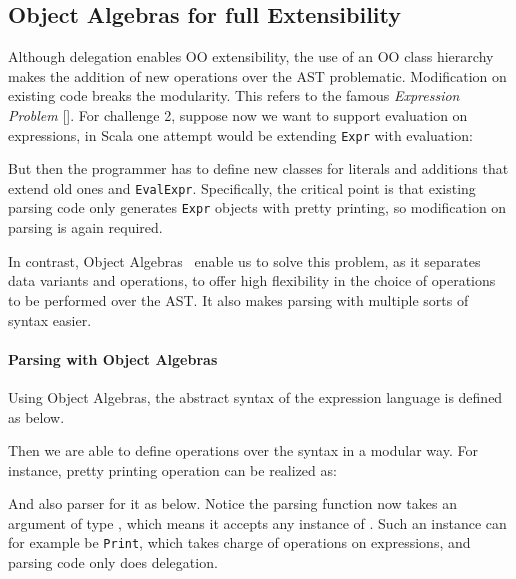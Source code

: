 \subsection{Object Algebras for full Extensibility}\label{subsec:overview-oa}

Although delegation enables OO extensibility, the use of an OO class
hierarchy makes the addition of new operations over the AST
problematic. Modification on existing code breaks the modularity. This
refers to the famous \textit{Expression Problem} []. For challenge 2, suppose now we want to
support evaluation on expressions, in Scala one attempt would be extending \lstinline{Expr} with
evaluation:

But then the programmer has to define new classes for literals and additions that extend old ones and \lstinline{EvalExpr}. Specifically,
the critical point is that existing parsing code only generates \lstinline{Expr} objects with pretty printing, so modification on parsing is again required.


In contrast, Object Algebras~\cite{Oliveira2012} enable us to solve this problem, as it separates data variants and
operations, to
offer high flexibility in the choice of operations to be performed
over the AST. It also makes parsing with multiple sorts of syntax easier.

\paragraph{Parsing with Object Algebras} Using Object Algebras, the abstract syntax of the expression language is defined as below.


Then we are able to define operations over the syntax in a modular way. For instance, pretty printing operation can be realized as:


And also parser for it as below. Notice the parsing function  now takes an argument of type , which means it accepts any instance of . Such an instance can for example be \lstinline{Print}, which takes charge of operations on expressions, and parsing code only does delegation.

